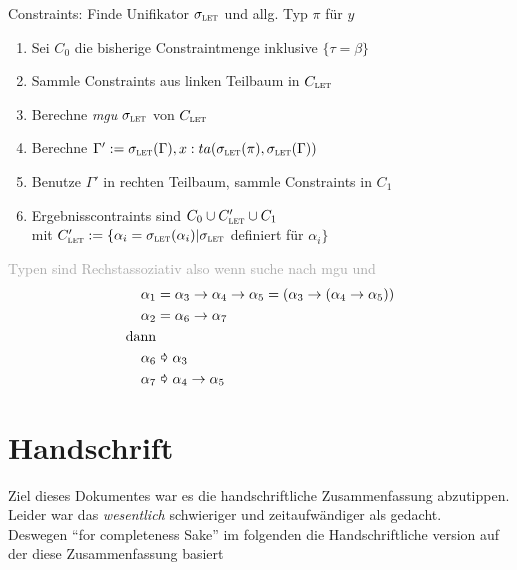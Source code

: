 \documentclass{Zusammenfassung}
\newcommand{\typeRule}[3]{ \textrm{\textsc{#1}}\frac{#2}{#3}}
\newcommand{\E}{\;}
\newcommand{\liin}[2]{#1\E{}#2}
\newcommand{\lii}[2]{(#1\E{}#2)}
\newcommand{\abs}[2]{\lambda{}#1.#2}
\begin{document}
    Constraints: Finde Unifikator $\sigma_\textsc{let}$ und allg. Typ $\pi$ für $y$
    \begin{enumerate}
        \item Sei $C_0$ die bisherige Constraintmenge inklusive $\{\tau=\beta\}$
        \item Sammle Constraints aus linken Teilbaum in $C_\textsc{let}$
        \item Berechne \textit{mgu} $\sigma_\textsc{let}$ von $C_\textsc{let}$
        \item Berechne $\Gamma':=\sigma_\textsc{let}(\Gamma),x:ta(\sigma_\textsc{let}(\pi),\sigma_\textsc{let}(\Gamma))$
        \item Benutze $\Gamma'$ in rechten Teilbaum, sammle Constraints in $C_1$
        \item Ergebnisscontraints sind $C_0\cup{}C'_\textsc{let}\cup{}C_1$\\
        mit $C'_\textsc{let} := \{\alpha_i = \sigma_\textsc{let}(\alpha_i)|\sigma_\textsc{let}$ definiert für $\alpha_i\}$
    \end{enumerate}
    \textcolor{darkgray}{
    Typen sind Rechstassoziativ also wenn suche nach mgu und
    \begin{equation*}
        \begin{aligned}
            \alpha_1&=\alpha_3\rightarrow\alpha_4\rightarrow\alpha_5  = (\alpha_3\rightarrow(\alpha_4\rightarrow\alpha_5))\\
            \alpha_2&=\alpha_6\rightarrow\alpha_7\\
            \text{dann}\\
           \alpha_6&\text{ \pointer\ }\alpha_3\\
            \alpha_7&\text{ \pointer\ }\alpha_4\rightarrow\alpha_5
        \end{aligned}
    \end{equation*}
    }
%
%
\section{Handschrift}
Ziel dieses Dokumentes war es  die handschriftliche Zusammenfassung abzutippen. Leider war das \emph{wesentlich} schwieriger und zeitaufwändiger als gedacht.\\
Deswegen \enquote{for completeness Sake} im folgenden die Handschriftliche version auf der diese Zusammenfassung basiert
\clearpage

\end{document}
